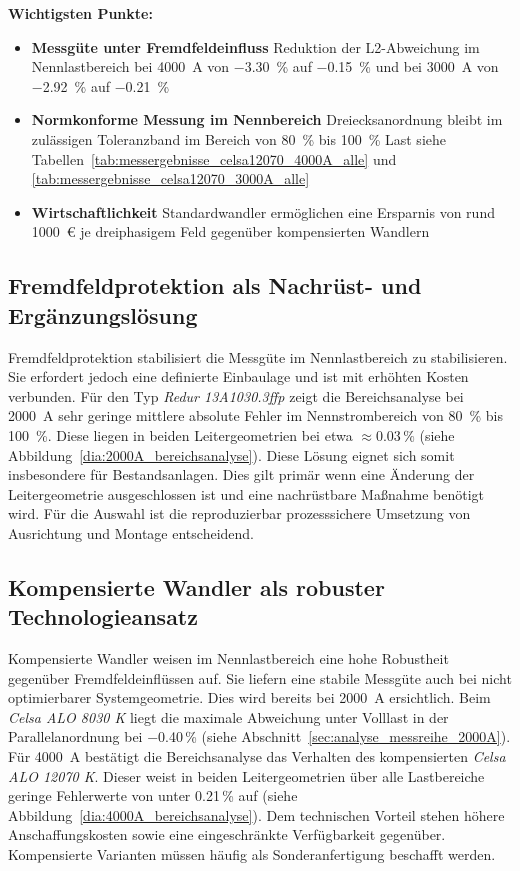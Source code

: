 \textbf{Wichtigsten Punkte:}
\begin{itemize}
    \item \textbf{Messgüte unter Fremdfeldeinfluss} Reduktion der L2-Abweichung im Nennlastbereich bei \SI{4000}{A} von \SI{-3,30}{\percent} auf \SI{-0,15}{\percent} und bei \SI{3000}{A} von \SI{-2,92}{\percent} auf \SI{-0,21}{\percent}
    \item \textbf{Normkonforme Messung im Nennbereich} Dreiecksanordnung bleibt im zulässigen Toleranzband im Bereich von \SI{80}{\percent} bis \SI{100}{\percent} Last siehe Tabellen~\ref{tab:messergebnisse_celsa12070_4000A_alle} und \ref{tab:messergebnisse_celsa12070_3000A_alle}
    \item \textbf{Wirtschaftlichkeit} Standardwandler ermöglichen eine Ersparnis von rund \SI{1000}{\euro} je dreiphasigem Feld gegenüber kompensierten Wandlern
\end{itemize}



\subsection*{Fremdfeldprotektion als Nachrüst- und Ergänzungslösung}

Fremdfeldprotektion stabilisiert die Messgüte im Nennlastbereich zu stabilisieren. Sie erfordert jedoch eine definierte Einbaulage und ist mit erhöhten Kosten verbunden. Für den Typ \textit{Redur 13A1030.3ffp} zeigt die Bereichsanalyse bei \SI{2000}{A} sehr geringe mittlere absolute Fehler im Nennstrombereich von \SI{80}{\percent} bis \SI{100}{\percent}. Diese liegen in beiden Leitergeometrien bei etwa \(\approx \num{0,03}\,\%\) (siehe Abbildung~\ref{dia:2000A_bereichsanalyse}). Diese Lösung eignet sich somit insbesondere für Bestandsanlagen. Dies gilt primär wenn eine Änderung der Leitergeometrie ausgeschlossen ist und eine nachrüstbare Maßnahme benötigt wird. Für die Auswahl ist die reproduzierbar prozesssichere Umsetzung von Ausrichtung und Montage entscheidend.

\subsection*{Kompensierte Wandler als robuster Technologieansatz}

Kompensierte Wandler weisen im Nennlastbereich eine hohe Robustheit gegenüber Fremdfeldeinflüssen auf. Sie liefern eine stabile Messgüte auch bei nicht optimierbarer Systemgeometrie. Dies wird bereits bei \SI{2000}{A} ersichtlich. Beim \textit{Celsa ALO 8030 K} liegt die maximale Abweichung unter Volllast in der Parallelanordnung bei \num{-0,40}\,\% (siehe Abschnitt~\ref{sec:analyse_messreihe_2000A}). Für \SI{4000}{A} bestätigt die Bereichsanalyse das Verhalten des kompensierten \textit{Celsa ALO 12070 K}. Dieser weist in beiden Leitergeometrien über alle Lastbereiche geringe Fehlerwerte von unter \num{0,21}\,\% auf (siehe Abbildung~\ref{dia:4000A_bereichsanalyse}). Dem technischen Vorteil stehen höhere Anschaffungskosten sowie eine eingeschränkte Verfügbarkeit gegenüber. Kompensierte Varianten müssen häufig als Sonderanfertigung beschafft werden.

